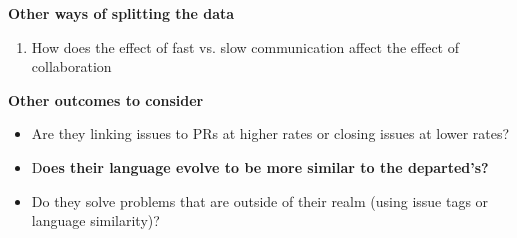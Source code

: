 \documentclass[12pt,notitlepage]{article}
\begin{document}
\textbf{Other ways of splitting the data}
\begin{enumerate}
\item How does the effect of fast vs. slow communication affect the effect of collaboration
\end{enumerate}
\textbf{Other outcomes to consider}
\begin{itemize}
\item Are they linking issues to PRs at higher rates or closing issues at lower rates?
\item D\textbf{oes their language evolve to be more similar to the departed's?}
\item Do they solve problems that are outside of their realm (using issue tags or language similarity)?
\end{itemize}
\end{document}
